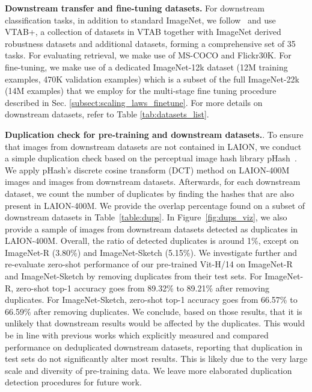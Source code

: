 \begin{appendix}
\textbf{Downstream transfer and fine-tuning datasets.} For downstream classification tasks, in addition to standard ImageNet, we follow~\cite{Schuhmann2022} and use VTAB+, a collection of datasets in VTAB together with ImageNet derived robustness datasets and additional datasets, forming a comprehensive set of 35 tasks. For evaluating retrieval, we make use of MS-COCO and Flickr30K. For fine-tuning, we make use of a dedicated ImageNet-12k dataset  (12M training examples, 470K validation examples) which is a subset of the full ImageNet-22k (14M examples) that we employ for the multi-stage fine tuning procedure described in Sec. \ref{subsect:scaling_laws_finetune}. For more details on downstream datasets, refer to Table \ref{tab:datasets_list}.

\textbf{Duplication check for pre-training and downstream datasets.}. To ensure that images from downstream datasets are not contained in LAION, we conduct a simple
duplication check based on the perceptual image hash library pHash~\cite{zauner2010implementation}.
We apply pHash's discrete cosine transform (DCT) method on LAION-400M images and images from downstream datasets. Afterwards, for each downstream dataset, we count the number of duplicates by finding the hashes that are also present in LAION-400M. We provide the overlap percentage found on a subset of  downstream datasets in Table~\ref{table:dups}. In Figure~\ref{fig:dups_viz}, we also provide a sample of images from downstream datasets detected as duplicates in LAION-400M. Overall, the ratio of detected duplicates is around 1\%, except on ImageNet-R (3.80\%) and ImageNet-Sketch (5.15\%). We investigate further and re-evaluate zero-shot performance of our pre-trained Vit-H/14 on ImageNet-R and ImageNet-Sketch by removing duplicates from their test sets. For ImageNet-R, zero-shot top-1 accuracy goes from 89.32\% to 89.21\% after removing duplicates. For ImageNet-Sketch, zero-shot top-1 accuracy goes from 66.57\% to 66.59\% after removing duplicates.
We conclude, based on those results, that it is unlikely that downstream results would be affected by the duplicates. This would be in line with previous works\citep{radford2021learning, zhai2021lit} which explicitly measured and compared performance on deduplicated downstream datasets, reporting that duplication in test sets do not significantly alter most results. This is likely due to the very large scale and diversity of pre-training data. We leave more elaborated duplication detection procedures for future work. 


\end{appendix}
